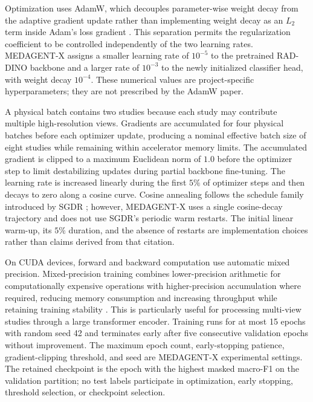 Optimization uses AdamW, which decouples parameter-wise weight decay from the adaptive gradient update rather than implementing weight decay as an $L_2$ term inside Adam's loss gradient \cite{loshchilov2019decoupled}. This separation permits the regularization coefficient to be controlled independently of the two learning rates. MEDAGENT-X assigns a smaller learning rate of $10^{-5}$ to the pretrained RAD-DINO backbone and a larger rate of $10^{-3}$ to the newly initialized classifier head, with weight decay $10^{-4}$. These numerical values are project-specific hyperparameters; they are not prescribed by the AdamW paper.

A physical batch contains two studies because each study may contribute multiple high-resolution views. Gradients are accumulated for four physical batches before each optimizer update, producing a nominal effective batch size of eight studies while remaining within accelerator memory limits. The accumulated gradient is clipped to a maximum Euclidean norm of $1.0$ before the optimizer step to limit destabilizing updates during partial backbone fine-tuning. The learning rate is increased linearly during the first $5\%$ of optimizer steps and then decays to zero along a cosine curve. Cosine annealing follows the schedule family introduced by SGDR \cite{loshchilov2017sgdr}; however, MEDAGENT-X uses a single cosine-decay trajectory and does not use SGDR's periodic warm restarts. The initial linear warm-up, its $5\%$ duration, and the absence of restarts are implementation choices rather than claims derived from that citation.

On CUDA devices, forward and backward computation use automatic mixed precision. Mixed-precision training combines lower-precision arithmetic for computationally expensive operations with higher-precision accumulation where required, reducing memory consumption and increasing throughput while retaining training stability \cite{micikevicius2018mixed}. This is particularly useful for processing multi-view studies through a large transformer encoder. Training runs for at most 15 epochs with random seed 42 and terminates early after five consecutive validation epochs without improvement. The maximum epoch count, early-stopping patience, gradient-clipping threshold, and seed are MEDAGENT-X experimental settings. The retained checkpoint is the epoch with the highest masked macro-F1 on the validation partition; no test labels participate in optimization, early stopping, threshold selection, or checkpoint selection.


